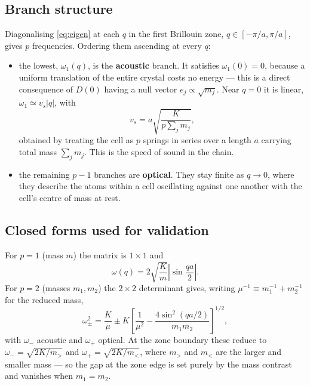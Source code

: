 \documentclass[aps,prb,reprint,nofootinbib]{revtex4-2}
\begin{document}
\subsection{Branch structure}

Diagonalising \eqref{eq:eigen} at each $q$ in the first Brillouin zone, $q \in [-\pi/a, \pi/a]$,
gives $p$ frequencies. Ordering them ascending at every $q$:

\begin{itemize}
  \item the lowest, $\omega_1(q)$, is the \textbf{acoustic} branch. It satisfies
        $\omega_1(0)=0$, because a uniform translation of the entire crystal costs no energy ---
        this is a direct consequence of $D(0)$ having a null vector $e_j \propto \sqrt{m_j}$.
        Near $q=0$ it is linear, $\omega_1 \simeq v_s |q|$, with
        \begin{equation}
          v_s = a\sqrt{\frac{K}{p\sum_j m_j}},
          \label{eq:vs}
        \end{equation}
        obtained by treating the cell as $p$ springs in series over a length $a$ carrying total
        mass $\sum_j m_j$. This is the speed of sound in the chain.
  \item the remaining $p-1$ branches are \textbf{optical}. They stay finite as $q \to 0$, where
        they describe the atoms within a cell oscillating against one another with the cell's
        centre of mass at rest.
\end{itemize}

\subsection{Closed forms used for validation}

For $p=1$ (mass $m$) the matrix is $1\times1$ and
\begin{equation}
  \omega(q) = 2\sqrt{\frac{K}{m}}\left|\sin\frac{qa}{2}\right|.
  \label{eq:mono}
\end{equation}
For $p=2$ (masses $m_1, m_2$) the $2\times2$ determinant gives, writing
$\mu^{-1} \equiv m_1^{-1} + m_2^{-1}$ for the reduced mass,
\begin{equation}
  \omega_\pm^2 = \frac{K}{\mu}
    \pm K \left[\frac{1}{\mu^2} - \frac{4\sin^2(qa/2)}{m_1 m_2}\right]^{1/2},
  \label{eq:di}
\end{equation}
with $\omega_-$ acoustic and $\omega_+$ optical. At the zone boundary these reduce to
$\omega_- = \sqrt{2K/m_{>}}$ and $\omega_+ = \sqrt{2K/m_{<}}$, where $m_{>}$ and $m_{<}$ are the
larger and smaller mass --- so the gap at the zone edge is set purely by the mass contrast and
vanishes when $m_1 = m_2$.
\end{document}

